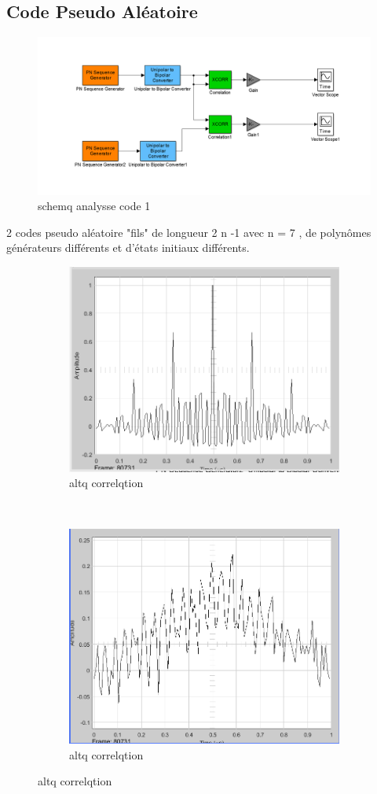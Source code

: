 \documentclass{report}
\begin{document}
\subsection{Code Pseudo Aléatoire}
\begin{figure}[h]
	\centering
	\includegraphics[width=0.7\linewidth]{schema_q2}
	\caption{schemq analysse code 1}
	\label{fig:schemaq2}
\end{figure}
 2 codes pseudo aléatoire "fils" de longueur 2 n -1 avec n = 7 ,
de polynômes générateurs différents et d'états initiaux différents.
\begin{figure}
	\centering
	\begin{subfigure}[b]{0.4\textwidth}
	\includegraphics[width=0.7\linewidth]{codean1_altacorr}
\caption{altq correlqtion}
\label{fig:codean1altacorr}
	\end{subfigure}
	~ %
	\begin{subfigure}[b]{0.4\textwidth}
	\includegraphics[width=0.7\linewidth]{codean1_bajacorr}
\caption{altq correlqtion}
\label{fig:codean1altacorr}
	\end{subfigure}
\end{figure}
\end{document}
